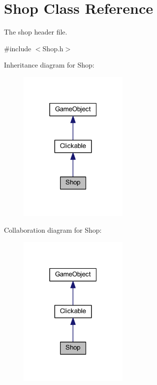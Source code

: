 \hypertarget{class_shop}{\section{Shop Class Reference}
\label{class_shop}
}


The shop header file.  




{\ttfamily \#include $<$Shop.\+h$>$}



Inheritance diagram for Shop\+:\nopagebreak
\begin{figure}[H]
\begin{center}
\leavevmode
\includegraphics[width=151pt]{class_shop__inherit__graph}
\end{center}
\end{figure}


Collaboration diagram for Shop\+:\nopagebreak
\begin{figure}[H]
\begin{center}
\leavevmode
\includegraphics[width=151pt]{class_shop__coll__graph}
\end{center}
\end{figure}
